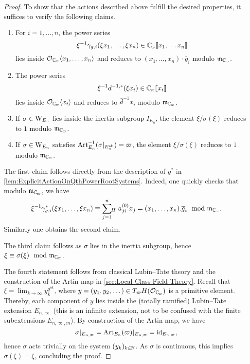 \documentclass[../main.tex]{subfiles}
\begin{document}
\begin{proof}
To show that the actions described above fulfill the desired properties, it suffices
to verify the following claims.
\begin{enumerate}
  \item For $i = 1, \dots, n$, the power series 
    $$\xi^{-1}\gamma_{g,i}(\xi x_1, \dots, \xi x_n) \in \Cp\llbr x_1, \dots x_n \rrbr$$
    lies inside $\cO_\Cp \langle x_1, \dots, x_n \rangle$ and reduces to $(x_1,
    \dots, x_n)\cdot \bar g_i$ modulo $\fm_\Cp$.
  \item The power series 
    \begin{equation*}
      \xi^{-1} d^{-1, *} (\xi x_i) \in \Cp \llbr x_i\rrbr 
    \end{equation*}
    lies inside $\cO_\Cp \langle x_i \rangle$ and reduces to $\bar d^{-1} x_i$
    modulo $\fm_\Cp$. 
  \item If $\sigma \in \mathrm W_{E_n}$ lies inside the inertia subgroup $I_{E_n}$,
    the element
    $\xi/\sigma(\xi)$ reduces to $1$ modulo $\fm_\Cp$.
  \item If $\sigma \in \mathrm W_{E_n}$ satisfies $\operatorname{Art}^{-1}_{E_n}(\sigma|_{E_n^{\mathrm{ab}}}) 
    = \varpi$, the element $\xi/\sigma(\xi)$ reduces to $1$ modulo $\fm_\Cp$. 
\end{enumerate}
The first claim follows directly from the description of $g^*$ in
\cref{lem:ExplicitActionOnQthPowerRootSystems}. Indeed, one quickly checks
that modulo $\fm_\Cp$, we have 
$$\xi^{-1} \gamma_{g,i}^*(\xi x_1, \dots, \xi x_n) \equiv \sum_{j=1}^n \sumH
a_{ji}^{(0)} x_j = (x_1, \dots, x_n).\bar g_i \mod \fm_\Cp.$$ 
Similarly one obtains the second claim.

The third claim follows as $\sigma$ lies in the inertia subgroup,
hence $\xi \equiv \sigma(\xi) \mod \fm_\Cp$.

The fourth statement follows from classical Lubin--Tate theory and the construction
of the Artin map in \cref{sec:Local Class Field Theory}. 
Recall that $\xi = \lim_{k \to \infty} y_k^{q^{nk}}$, where $y =(y_1, y_2, \dots) 
\in T_\varpi H(\cO_\Cp)$ is a primitive element.
Thereby, each component of $y$ lies inside the (totally ramified) Lubin--Tate
extension $E_{n,\varpi}$ (this is an infinite extension, not to be confused with
the finite subextensions $E_{n, \varpi,m}$). By construction of the Artin map,
we have
$$\sigma|_{E_{n,\varpi}} = \operatorname{Art}_{E_{n}}(\varpi)|_{E_{n, \varpi}} =  \operatorname{id}_{E_{n,\varpi}},$$
hence $\sigma$ acts trivially on
the system $(y_k)_{k\in \mathbb{N}}$. As $\sigma$ is continuous, this implies
$\sigma(\xi) = \xi$, concluding the proof.
\end{proof}
\end{document}
